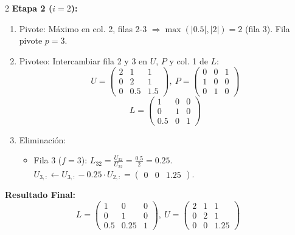 \documentclass[10pt]{extarticle}
\begin{document}
\begin{multicols}{2}
\textbf{Etapa 2 ($i=2$):}
\begin{enumerate}
\item Pivote: Máximo en col. 2, filas 2-3 $\Rightarrow \max(|0.5|,|2|)=2$ (fila 3). Fila pivote $p=3$.
\item Pivoteo: Intercambiar fila 2 y 3 en $U$, $P$ y col. 1 de $L$:
$$U=\begin{pmatrix}2&1&1\\0&2&1\\0&0.5&1.5\end{pmatrix},\ P=\begin{pmatrix}0&0&1\\1&0&0\\0&1&0\end{pmatrix}$$
$$L=\begin{pmatrix}1&0&0\\0&1&0\\0.5&0&1\end{pmatrix}$$
\item Eliminación:
\begin{itemize}[leftmargin=1.2em]
\item Fila 3 ($f=3$): $L_{32}=\frac{U_{32}}{U_{22}}=\frac{0.5}{2}=0.25$. \\ $U_{3,:} \leftarrow U_{3,:}-0.25\cdot U_{2,:} = \begin{pmatrix}0&0&1.25\end{pmatrix}$.
\end{itemize}
\end{enumerate}

\textbf{Resultado Final:}
$$L=\begin{pmatrix}1&0&0\\0&1&0\\0.5&0.25&1\end{pmatrix},\ U=\begin{pmatrix}2&1&1\\0&2&1\\0&0&1.25\end{pmatrix}$$

\end{multicols}
\end{document}
